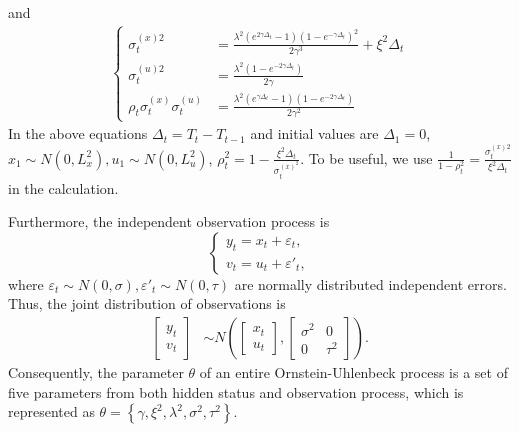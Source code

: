 and 
\begin{align}
\begin{cases}
\sigma_t^{(x)2} &=\frac{\lambda^2 \left(e^{2 \gamma\Delta_t}-1\right) \left(1 -e^{-\gamma\Delta_t}\right)^2}{2 \gamma ^3 } + \xi^2\Delta_t\\
\sigma_t^{(u)2} &= \frac{\lambda ^2 \left(1- e^{-2 \gamma\Delta_t}\right)}{2 \gamma } \\
\rho_t\sigma_t^{(x)}\sigma_t^{(u)} & =\frac{\lambda ^2 \left(e^{\gamma\Delta_t} -1\right) \left(1-e^{-2\gamma\Delta_t}\right)}{2 \gamma ^2}
\end{cases}
\end{align}
In the above equations $\Delta_t = T_t-T_{t-1}$ and initial values are $\Delta_1=0$, %
$x_1\sim N\left(0,L_x^2\right), u_1\sim N(0,L_u^2)$, 
$\rho_t^2 = 1-\frac{\xi^2 \Delta_t}{\sigma_t^{(x)^2}}$. To be useful, we use $\frac{1}{1-\rho_t^2} =\frac{\sigma_t^{(x)2}}{\xi^2 \Delta_t}$ in the calculation. 

Furthermore, the independent observation process is 
\begin{equation}\label{obseq}
\begin{cases} y_t=x_t+\varepsilon_t,\\ v_t=u_t+\varepsilon'_t, \end{cases} 
\end{equation}
where $\varepsilon_t\sim N(0,\sigma),\varepsilon'_t\sim N(0,\tau)$ are normally distributed independent errors. Thus, the joint distribution of observations is 
\begin{align}\label{obmodel}
\begin{bmatrix} y_t \\ v_t \end{bmatrix} &\sim N\left(
\begin{bmatrix}x_t \\ u_t \end{bmatrix} , 
\begin{bmatrix}
\sigma^2 & 0\\
0 & \tau^2
\end{bmatrix} \right).
\end{align}
Consequently, the parameter $\theta$ of an entire Ornstein-Uhlenbeck process is a set of five parameters from both hidden status and observation process, which is represented as $\theta = \left\lbrace \gamma,\xi^2,\lambda^2,\sigma^2,\tau^2 \right\rbrace$. 


